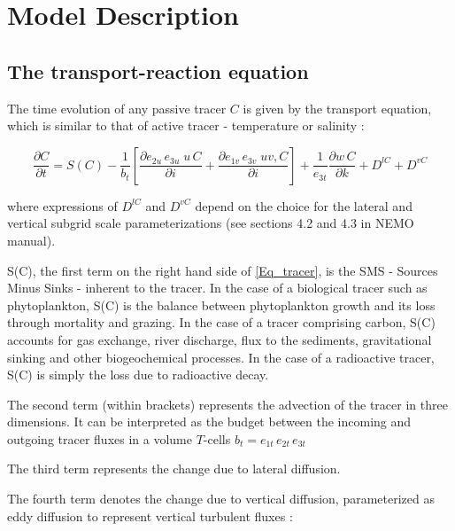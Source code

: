 \documentclass[../main/TOP_manual]{subfiles}
\begin{document}
\newcommand{\cd}{\mathrm{CO_2}}
\newcommand{\Ct}{\mathrm{C_T}}
\newcommand{\pacd}{\mathrm{p^a_{CO_2}}}
\newcommand{\cq}{\mathrm{^{14}C}}
\newcommand{\Dcq}{\Delta ^{14}\mathrm{C}}
\newcommand{\Rq}{\mathrm{^{14}{R}}}

\chapter{Model Description}
\label{chap:ModDes}

\section{The transport-reaction equation}
\label{sec:Bas}

The time evolution of any passive tracer $C$ is given by the transport equation, which is similar to that of active tracer - temperature or salinity :

\begin{equation}
\frac{\partial C}{\partial t} = {S(C)} -  \frac{1}{b_t} \left[   \frac{\partial e_{2u}\,e_{3u} \;  u\, C}{\partial i} +   \frac{\partial e_{1v}\,e_{3v} \;  uv, C}{\partial i}  \right] + \frac{1}{e_{3t}} \frac{\partial w\, C}{\partial k} + D^{lC} + D^{vC}
\label{Eq_tracer}
\end{equation}

where expressions of $D^{lC}$ and $D^{vC}$ depend on the choice for the lateral and vertical subgrid scale parameterizations (see sections 4.2 and 4.3 in NEMO manual).

{S(C)}, the first term on the right hand side of \autoref{Eq_tracer}, is the SMS - Sources Minus Sinks - inherent to the tracer.
In the case of a biological tracer such as phytoplankton, {S(C)} is the balance between phytoplankton growth and its loss through mortality and grazing.
In the case of a tracer comprising carbon,  {S(C)} accounts for gas exchange, river discharge, flux to the sediments, gravitational sinking and other biogeochemical processes.
In the case of a radioactive tracer, {S(C)} is simply the loss due to radioactive decay.

The second term (within brackets) represents the advection of the tracer in three dimensions.
It can be interpreted as the budget between the incoming and outgoing tracer fluxes in a volume $T$-cells $b_t= e_{1t}\,e_{2t}\,e_{3t}$

The third term represents the change due to lateral diffusion.

The fourth term denotes the change due to vertical diffusion, parameterized as eddy diffusion to represent vertical turbulent fluxes :
\end{document}
